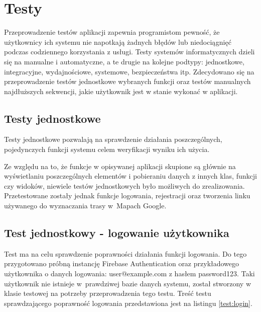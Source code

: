 \section{Testy}
Przeprowadzenie testów aplikacji zapewnia programistom pewność, że użytkownicy ich systemu nie napotkają żadnych błędów lub niedociągnięć podczas codziennego korzystania z usługi. Testy systemów informatycznych dzieli się na manualne i automatyczne, a te drugie na kolejne podtypy: jednostkowe, integracyjne, wydajnościowe, systemowe, bezpieczeństwa itp. Zdecydowano się na przeprowadzenie testów jednostkowe wybranych funkcji oraz testów manualnych najdłuższych sekwencji, jakie użytkownik jest w stanie wykonać w aplikacji.
\subsection{Testy jednostkowe}
Testy jednostkowe pozwalają na sprawdzenie działania poszczególnych, pojedynczych funkcji systemu celem weryfikacji wyniku ich użycia. \par
Ze względu na to, że funkcje w opisywanej aplikacji skupione są głównie na wyświetlaniu poszczególnych elementów i pobieraniu danych z innych klas, funkcji czy widoków, niewiele testów jednostkowych było możliwych do zrealizowania. Przetestowane zostały jednak funkcje logowania, rejestracji oraz tworzenia linku używanego do wyznaczania trasy w~Mapach Google. 

\subsection*{Test jednostkowy - logowanie użytkownika}
Test ma na celu sprawdzenie poprawności działania funkcji logowania. Do tego przygotowano próbną instancję Firebase Authentication oraz przykładowego użytkownika o danych logowania: user@example.com z hasłem password123. Taki użytkownik nie istnieje w~prawdziwej bazie danych systemu, został stworzony w klasie testowej na potrzeby  przeprowadzenia tego testu. Treść testu sprawdzającego poprawność logowania przedstawiona jest na listingu \ref{test:login}. \\

\noindent
\begin{minipage}{\linewidth}
    \label{test:login}
    \centering
\end{minipage}
\\


